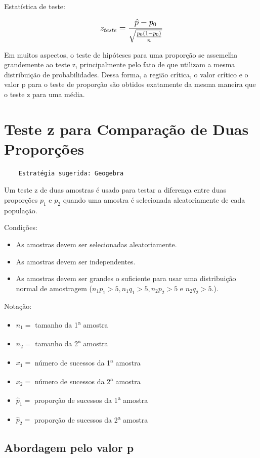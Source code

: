 Estatística de teste:

 \[\beq{ z_{teste} = \frac{\hat{p}-p_0}{\sqrt{\frac{p_0(1-p_0)}{n}}} }\]
 
Em muitos aspectos, o teste de hipóteses para uma proporção se assemelha grandemente ao teste z, principalmente pelo fato de que utilizam a mesma distribuição de probabilidades. Dessa forma, a região crítica, o valor crítico e o valor p para o teste de proporção são obtidos exatamente da mesma maneira que o teste z para uma média.

\section{Teste z para Comparação de Duas Proporções}

\begin{verbatim}
	Estratégia sugerida: Geogebra 
\end{verbatim}

Um teste z de duas amostras é usado para testar a diferença entre duas proporções \(p_1\) e \(p_2\) quando uma amostra é selecionada aleatoriamente de cada população.

Condições:
\begin{itemize}
	\item As amostras devem ser selecionadas aleatoriamente.
	\item As amostras devem ser independentes.
	\item As amostras devem ser grandes o suficiente para usar uma distribuição normal de amostragem (\( n_1p_1 > 5, n_1q_1 > 5, n_2p_2 > 5 \) e \( n_2q_2 > 5. \)).
\end{itemize}

Notação:
\begin{itemize}
	\item \(n_1 = \) tamanho da 1\textsuperscript{a} amostra
	\item \(n_2 = \) tamanho da 2\textsuperscript{a} amostra
	\item \(x_1 = \) número de sucessos da 1\textsuperscript{a} amostra	
	\item \(x_2 = \) número de sucessos da 2\textsuperscript{a} amostra		
	\item \(\hat{p}_1 = \) proporção de sucessos da 1\textsuperscript{a} amostra	
	\item \(\hat{p}_2 = \) proporção de sucessos da 2\textsuperscript{a} amostra		
\end{itemize}

\subsection{Abordagem pelo valor p}


